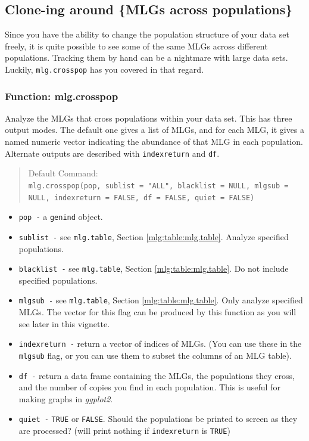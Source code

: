 \documentclass[letterpaper]{article}
\newcommand{\tab}{\hspace*{1em}}
\begin{document}
\subsection{Clone-ing around \{MLGs across populations\}}\label{mlg:cross}

\tab\tab Since you have the ability to change the population structure of your data set freely, it is quite possible to see some of the same MLGs across different populations. Tracking them by hand can be a nightmare with large data sets. Luckily, \texttt{mlg.crosspop} has you covered in that regard.
\subsubsection{Function: mlg.crosspop}\label{mlg:cross:mlg.crosspop}

\tab\tab Analyze the MLGs that cross populations within your data set. This has three output modes. The default one gives a list of MLGs, and for each MLG, it gives a named numeric vector indicating the abundance of that MLG in each population. Alternate outputs are described with \texttt{indexreturn} and \texttt{df}.
\begin{quote}
Default Command:\\
\texttt{mlg.crosspop(pop, sublist = "ALL", blacklist = NULL, mlgsub = NULL, indexreturn = FALSE, df = FALSE, quiet = FALSE)}
\end{quote}
  \begin{itemize}
    \item \texttt{pop -} a \texttt{genind} object.
    \item \texttt{sublist -} see \texttt{mlg.table}, Section \ref{mlg:table:mlg.table}. Analyze specified populations.
    \item \texttt{blacklist -} see \texttt{mlg.table}, Section \ref{mlg:table:mlg.table}. Do not include specified populations.
    \item \texttt{mlgsub -} see \texttt{mlg.table}, Section \ref{mlg:table:mlg.table}. Only analyze specified MLGs. The vector for this flag can be produced by this function as you will see later in this vignette.
    \item \texttt{indexreturn -} return a vector of indices of MLGs. (You can use these in the \texttt{mlgsub} flag, or you can use them to subset the columns of an MLG table). 
    \item \texttt{df -} return a data frame containing the MLGs, the populations they cross, and the number of copies you find in each population. This is useful for making graphs in \textit{ggplot2}.
    \item \texttt{quiet -} \texttt{TRUE} or \texttt{FALSE}. Should the populations be printed to screen as they are processed? (will print nothing if \texttt{indexreturn} is \texttt{TRUE})
  \end{itemize}
  
\end{document}
